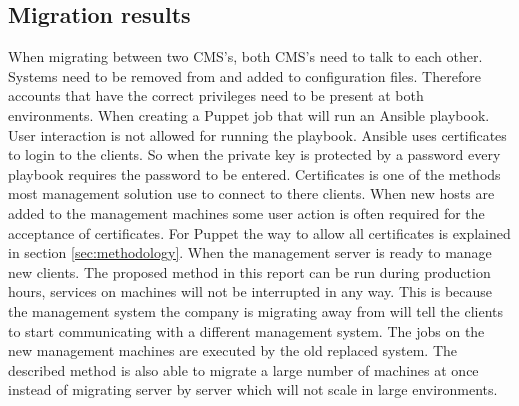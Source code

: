 \subsection{Migration results}
When migrating between two CMS's, both CMS's need to talk to each other. Systems need to be removed from and added to configuration files. Therefore accounts that have the correct privileges need to be present at both environments. When creating a Puppet job that will run an Ansible playbook. User interaction is not allowed for running the playbook. Ansible uses certificates to login to the clients. So when the private key is protected by a password every playbook requires the password to be entered. Certificates is one of the methods most management solution use to connect to there clients. When new hosts are added to the management machines some user action is often required for the acceptance of certificates. For Puppet the way to allow all certificates is explained in section \ref{sec:methodology}. When the management server is ready to manage new clients. The proposed method in this report can be run during production hours, services on machines will not be interrupted in any way. This is because the management system the company is migrating away from will tell the clients to start communicating with a different management system. The jobs on the new management machines are executed by the old replaced system. The described method is also able to migrate a large number of machines at once instead of migrating server by server which will not scale in large environments. 

